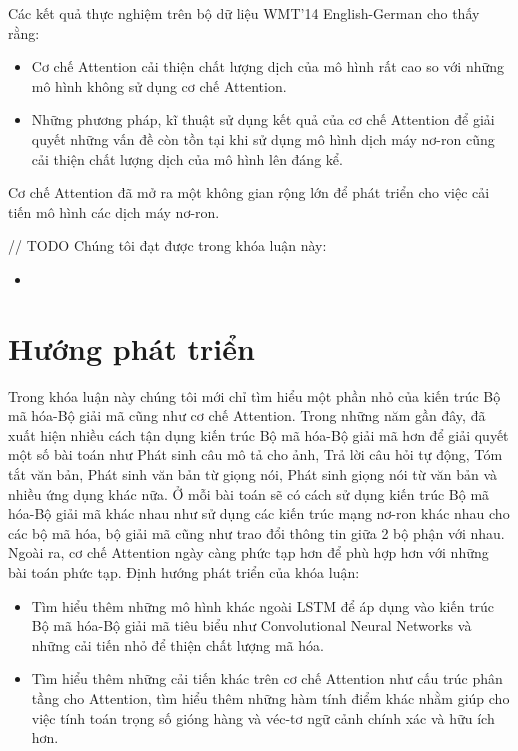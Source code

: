 Các kết quả thực nghiệm trên bộ dữ liệu WMT'14 English-German cho thấy rằng:
\begin{itemize}
	\item Cơ chế Attention cải thiện chất lượng dịch của mô hình rất cao so với những mô hình không sử dụng cơ chế Attention.
	\item Những phương pháp, kĩ thuật sử dụng kết quả của cơ chế Attention để giải quyết những vấn đề còn tồn tại khi sử dụng mô hình dịch máy nơ-ron cũng cải thiện chất lượng dịch của mô hình lên đáng kể.
\end{itemize}

Cơ chế Attention đã mở ra một không gian rộng lớn để phát triển cho việc cải tiến mô hình các dịch máy nơ-ron.

// TODO Chúng tôi đạt được trong khóa luận này:
\begin{itemize}
	\item 
\end{itemize}

\section{Hướng phát triển}
Trong khóa luận này chúng tôi mới chỉ tìm hiểu một phần nhỏ của kiến trúc Bộ mã hóa-Bộ giải mã cũng như cơ chế Attention. Trong những năm gần đây, đã xuất hiện nhiều cách tận dụng kiến trúc Bộ mã hóa-Bộ giải mã hơn để giải quyết một số bài toán như Phát sinh câu mô tả cho ảnh, Trả lời câu hỏi tự động, Tóm tắt văn bản, Phát sinh văn bản từ giọng nói, Phát sinh giọng nói từ văn bản và nhiều ứng dụng khác nữa. Ở mỗi bài toán sẽ có cách sử dụng kiến trúc Bộ mã hóa-Bộ giải mã khác nhau như sử dụng các kiến trúc mạng nơ-ron khác nhau cho các bộ mã hóa, bộ giải mã cũng như trao đổi thông tin giữa 2 bộ phận với nhau. Ngoài ra, cơ chế Attention ngày càng phức tạp hơn để phù hợp hơn với những bài toán phức tạp. Định hướng phát triển của khóa luận:
\begin{itemize}
	\item Tìm hiểu thêm những mô hình khác ngoài LSTM để áp dụng vào kiến trúc Bộ mã hóa-Bộ giải mã tiêu biểu như Convolutional Neural Networks và những cải tiến nhỏ để thiện chất lượng mã hóa.
	\item Tìm hiểu thêm những cải tiến khác trên cơ chế Attention như cấu trúc phân tầng cho Attention, tìm hiểu thêm những hàm tính điểm khác nhằm giúp cho việc tính toán trọng số gióng hàng và véc-tơ ngữ cảnh chính xác và hữu ích hơn. 
\end{itemize}



